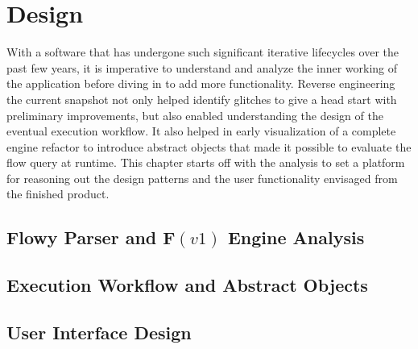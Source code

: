 \chapter{Design}\label{ch:design}

With a software that has undergone such significant iterative lifecycles over
the past few years, it is imperative to understand and analyze the inner
working of the application before diving in to add more functionality. Reverse
engineering the current snapshot not only helped identify glitches to give a
head start with preliminary improvements, but also enabled understanding the
design of the eventual execution workflow. It also helped in early
visualization of a complete engine refactor to introduce abstract objects that
made it possible to evaluate the flow query at runtime. This chapter starts off
with the analysis to set a platform for reasoning out the design patterns and
the user functionality envisaged from the finished product.

\section{Flowy Parser and F$(v1)$ Engine Analysis}\label{sec:adt-workflow}


\section{Execution Workflow and Abstract Objects}\label{sec:adt-workflow}


\section{User Interface Design}\label{sec:engine-interface}

